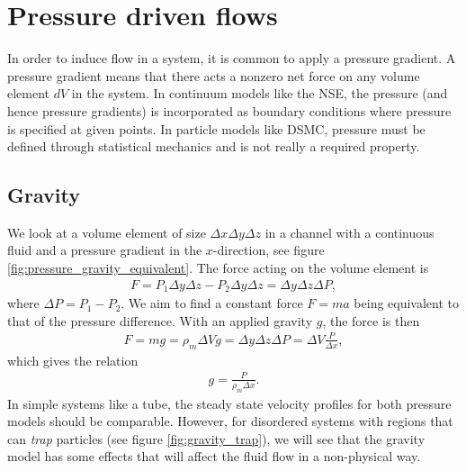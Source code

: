 \section{Pressure driven flows}
In order to induce flow in a system, it is common to apply a pressure gradient. A pressure gradient means that there acts a nonzero net force on any volume element $dV$ in the system. In continuum models like the NSE, the pressure (and hence pressure gradients) is incorporated as boundary conditions where pressure is specified at given points. In particle models like DSMC, pressure must be defined through statistical mechanics and is not really a required property.

\subsection{Gravity}
We look at a volume element of size $\Delta x\Delta y\Delta z$ in a channel with a continuous fluid and a pressure gradient in the $x$-direction, see figure \ref{fig:pressure_gravity_equivalent}. The force acting on the volume element is
\begin{align}
	F = P_1\Delta y\Delta z - P_2\Delta y\Delta z = \Delta y\Delta z\Delta P,
\end{align}
where $\Delta P = P_1 - P_2$. We aim to find a constant force $F=ma$ being equivalent to that of the pressure difference. With an applied gravity $g$, the force is then
\begin{align}
	F = mg = \rho_m \Delta V g = \Delta y\Delta z\Delta P = \Delta V \frac{P}{\Delta x},
\end{align}
which gives the relation
\begin{align}
	g = \frac{P}{\rho_m\Delta x}.
\end{align}
In simple systems like a tube, the steady state velocity profiles for both pressure models should be comparable. However, for disordered systems with regions that can \textit{trap} particles (see figure \ref{fig:gravity_trap}), we will see that the gravity model has some effects that will affect the fluid flow in a non-physical way. 